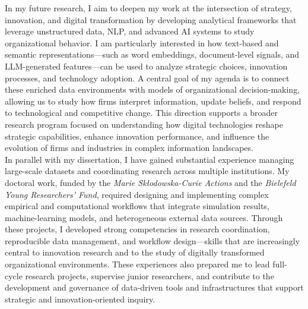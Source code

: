 \documentclass{nfr}
\begin{document}
In my future research, I aim to deepen my work at the intersection of strategy, innovation, and digital transformation by developing analytical frameworks that leverage unstructured data, NLP, and advanced AI systems to study organizational behavior. 
I am particularly interested in how text-based and semantic representations—such as word embeddings, document-level signals, and LLM-generated features—can be used to analyze strategic choices, innovation processes, and technology adoption. 
A central goal of my agenda is to connect these enriched data environments with models of organizational decision-making, allowing us to study how firms interpret information, update beliefs, and respond to technological and competitive change. 
This direction supports a broader research program focused on understanding how digital technologies reshape strategic capabilities, enhance innovation performance, and influence the evolution of firms and industries in complex information landscapes.\\

In parallel with my dissertation, I have gained substantial experience managing large-scale datasets and coordinating research across multiple institutions. 
My doctoral work, funded by the \textit{Marie Skłodowska-Curie Actions} and the \textit{Bielefeld Young Researchers’ Fund}, required designing and implementing complex empirical and computational workflows that integrate simulation results, machine-learning models, and heterogeneous external data sources. 
Through these projects, I developed strong competencies in research coordination, reproducible data management, and workflow design—skills that are increasingly central to innovation research and to the study of digitally transformed organizational environments. 
These experiences also prepared me to lead full-cycle research projects, supervise junior researchers, and contribute to the development and governance of data-driven tools and infrastructures that support strategic and innovation-oriented inquiry.\\
\end{document}
